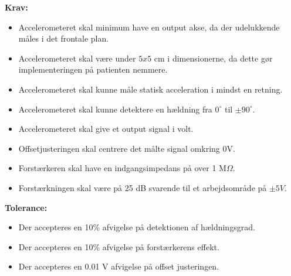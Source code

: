 \noindent\textbf{Krav:}
\begin{itemize}
	\item Accelerometeret skal minimum have en output akse, da der udelukkende måles i det frontale plan.
	\item Accelerometeret skal være under $5x5$ cm i dimensionerne, da dette gør implementeringen på patienten nemmere.
	\item Accelerometeret skal kunne måle statisk acceleration i mindst en retning.
	\item Accelerometeret skal kunne detektere en hældning fra $0^{\circ}$ til $\pm 90^{\circ}$.
	\item Accelerometeret skal give et output signal i volt.
	\item Offsetjusteringen skal centrere det målte signal omkring 0V.
	\item Forstærkeren skal have en indgangsimpedans på over 1 M$\Omega$. 
	\item Forstærkningen skal være på 25 dB svarende til et arbejdsområde på $\pm 5 V$.
\end{itemize}
\textbf{Tolerance:}
\begin{itemize}
	\item Der accepteres en 10\% afvigelse på detektionen af hældningsgrad.
	\item Der accepteres en 10\% afvigelse på forstærkerens effekt.
	\item Der accepteres en 0.01 V afvigelse på offset justeringen.
\end{itemize}
